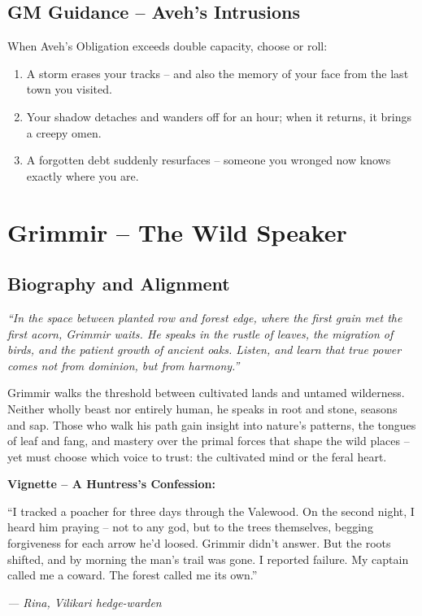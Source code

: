 \documentclass[10pt,a5paper]{book}
\begin{document}
\subsection*{GM Guidance – Aveh’s Intrusions}

When Aveh’s Obligation exceeds double capacity, choose or roll:
\begin{enumerate}
    \item A storm erases your tracks – and also the memory of your face from the last town you visited.
    \item Your shadow detaches and wanders off for an hour; when it returns, it brings a creepy omen.
    \item A forgotten debt suddenly resurfaces – someone you wronged now knows exactly where you are.
\end{enumerate}

\clearpage
\section{Grimmir – The Wild Speaker}
\label{patron:grimmir}

\subsection*{Biography and Alignment}

\textit{“In the space between planted row and forest edge, where the first grain met the first acorn, Grimmir waits. He speaks in the rustle of leaves, the migration of birds, and the patient growth of ancient oaks. Listen, and learn that true power comes not from dominion, but from harmony.”}

Grimmir walks the threshold between cultivated lands and untamed wilderness. Neither wholly beast nor entirely human, he speaks in root and stone, seasons and sap. Those who walk his path gain insight into nature’s patterns, the tongues of leaf and fang, and mastery over the primal forces that shape the wild places – yet must choose which voice to trust: the cultivated mind or the feral heart.

\textbf{Vignette – A Huntress’s Confession:}
\epigraph{“I tracked a poacher for three days through the Valewood. On the second night, I heard him praying – not to any god, but to the trees themselves, begging forgiveness for each arrow he’d loosed. Grimmir didn’t answer. But the roots shifted, and by morning the man’s trail was gone. I reported failure. My captain called me a coward. The forest called me its own.”}{\textit{— Rina, Vilikari hedge-warden}}
\end{document}
